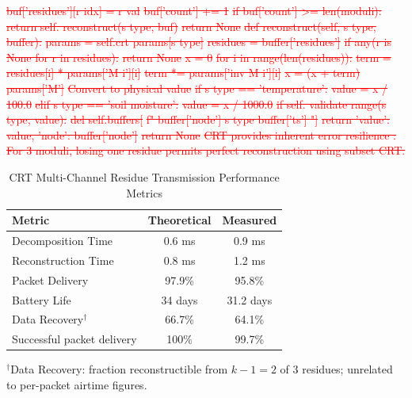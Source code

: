 \documentclass[pdflatex,sn-mathphys-num]{sn-jnl}
\theoremstyle{thmstyleone}
\theoremstyle{thmstyletwo}
\theoremstyle{thmstylethree}
\begin{document}
{\textcolor{red}{\sout{buf['residues'][r idx] = r val}}
\textcolor{red}{\sout{buf['count'] += 1}}
\textcolor{red}{\sout{if buf['count'] >= len(moduli):}}
\textcolor{red}{\sout{return self. reconstruct(s type, buf)}}
\textcolor{red}{\sout{return None}}
\textcolor{red}{\sout{def reconstruct(self, s type, buffer):}}
\textcolor{red}{\sout{params = self.crt params[s type]}}
\textcolor{red}{\sout{residues = buffer['residues']}}
\textcolor{red}{\sout{if any(r is None for r in residues):}}
\textcolor{red}{\sout{return None}}
\textcolor{red}{\sout{x = 0}}
\textcolor{red}{\sout{for i in range(len(residues)):}}
\textcolor{red}{\sout{term = residues[i] * params['M i'][i]}}
\textcolor{red}{\sout{term *= params['inv M i'][i]}}
\textcolor{red}{\sout{x = (x + term) params['M']}}
\textcolor{red}{\sout{Convert to physical value}}
\textcolor{red}{\sout{if s type == 'temperature':}}
\textcolor{red}{\sout{value = x / 100.0}}
\textcolor{red}{\sout{elif s type == 'soil moisture':}}
\textcolor{red}{\sout{value = x / 1000.0}}
\textcolor{red}{\sout{if self. validate range(s type, value):}}
\textcolor{red}{\sout{del self.buffers[}}
\textcolor{red}{\sout{f" buffer['node'] s type buffer['ts'] "]}}
\textcolor{red}{\sout{return 'value': value, 'node': buffer['node']}}
\textcolor{red}{\sout{return None}}
\textcolor{red}{\sout{CRT provides inherent error resilience :}}
\textcolor{red}{\sout{For 3 moduli, losing one residue permits perfect reconstruction using subset CRT.}}
\begin{table}[htbp]
\caption{CRT Multi-Channel Residue Transmission Performance Metrics}
\label{tab:crt-performance}
\scriptsize
\centering
\begin{tabular}{p{}cc}
\toprule
\textbf{Metric} & \textbf{Theoretical} & \textbf{Measured} \\
\midrule
Decomposition Time & 0.6 ms & 0.9 ms \\
Reconstruction Time & 0.8 ms & 1.2 ms \\
Packet Delivery & 97.9\% & 95.8\% \\
Battery Life & 34 days & 31.2 days \\
Data Recovery$^\dagger$ & 66.7\% & 64.1\% \\
Successful packet delivery & 100\% & 99.7\% \\
\bottomrule
\end{tabular}
{\footnotesize $^\dagger$Data Recovery: fraction reconstructible from $k-1=2$ of 3 residues; unrelated to per-packet airtime figures.}
\end{table}

}
\end{document}
